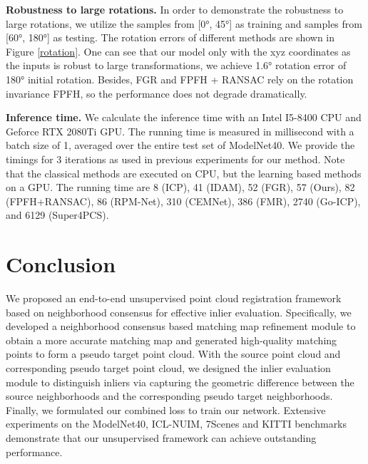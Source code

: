 \documentclass[letterpaper]{article} %
\begin{document}
	\noindent \textbf {Robustness to large rotations.}
	In order to demonstrate the robustness to large rotations, we utilize the samples from [\ang{0}, \ang{45}] as training and samples from [\ang{60}, \ang{180}] as testing. The rotation errors of different methods are shown in Figure \ref{rotation}. One can see that our model only with the xyz coordinates as the inputs is robust to large transformations, we achieve \ang{1.6} rotation error of \ang{180} initial rotation. Besides, FGR and FPFH + RANSAC rely on the rotation invariance FPFH, so the performance does not degrade dramatically.



	\noindent \textbf{Inference time.} We calculate the inference time with an Intel I5-8400 CPU and Geforce RTX 2080Ti GPU. The running time is measured in millisecond with a batch size of 1, averaged over the entire test set of ModelNet40. We provide the timings for 3 iterations as used in previous experiments for our method. Note that the classical methods are executed on CPU, but the learning based methods on a GPU. The running time are 8 (ICP), 41 (IDAM), 52 (FGR), 57 (Ours), 82 (FPFH+RANSAC), 86 (RPM-Net), 310 (CEMNet), 386 (FMR), 2740 (Go-ICP), and 6129 (Super4PCS). %

	\section{Conclusion}
	We proposed an end-to-end unsupervised point cloud registration framework based on neighborhood consensus for effective inlier evaluation. Specifically, we developed a neighborhood consensus based matching map refinement module to obtain a more accurate matching map and generated high-quality matching points to form a pseudo target point cloud. With the source point cloud and corresponding pseudo target point cloud, we designed the inlier evaluation module to distinguish inliers via capturing the geometric difference between the source neighborhoods and the corresponding pseudo target neighborhoods.
	Finally, we formulated our combined loss to train our network. Extensive experiments on the ModelNet40, ICL-NUIM, 7Scenes and KITTI benchmarks demonstrate that our unsupervised framework can achieve outstanding performance.
\end{document}
